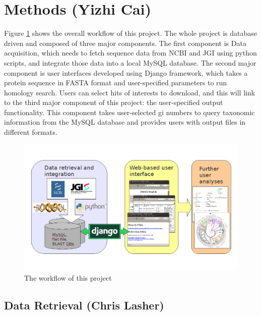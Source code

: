\documentclass[11pt,letterpaper,twoside,english]{article}
\begin{document}
\section{Methods (Yizhi Cai)}

Figure \ref{fig:The-workflow-of} shows the overall workflow of this
project. The whole project is database driven and composed of three
major components. The first component is Data acquisition, which needs
to fetch sequence data from NCBI and JGI using python scripts, and
integrate those data into a local MySQL database. The second major
component is user interfaces developed using Django framework, which
takes a protein sequence in FASTA format and user-specified parameters
to run homology search. Users can select hits of interests to download,
and this will link to the third major component of this project: the
user-specified output functionality. This component takes user-selected
gi numbers to query taxonomic information from the MySQL database
and provides users with output files in different formats.

\begin{figure}[tbph]
\begin{centering}
\includegraphics[width=0.95\linewidth]{figures/workflow.png}
\par\end{centering}

\caption{\label{fig:The-workflow-of}The workflow of this project}

\end{figure}


\subsection{\label{sub:Data-Retrieval}Data Retrieval (Chris Lasher)}
\end{document}
